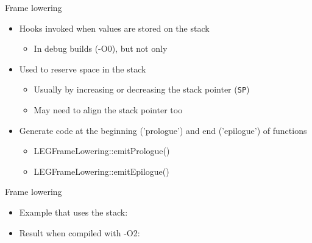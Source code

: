
\begin{frame}{Frame lowering}

\begin{itemize}
    \item Hooks invoked when values are stored on the stack
    \begin{itemize}
        \item In debug builds (-O0), but not only
    \end{itemize}
    \item Used to reserve space in the stack
    \begin{itemize}
        \item Usually by increasing or decreasing the stack pointer (\texttt{SP})
        \item May need to align the stack pointer too
    \end{itemize}
    \item Generate code at the beginning ('prologue') and end ('epilogue') of functions
    \begin{itemize}
        \item LEGFrameLowering::emitPrologue()
        \item LEGFrameLowering::emitEpilogue()
    \end{itemize}
\end{itemize}

\end{frame}


\begin{frame}{Frame lowering}

\begin{itemize}
    \item Example that uses the stack:
\end{itemize}


\begin{itemize}
    \item Result when compiled with -O2:
\end{itemize}


\end{frame}

